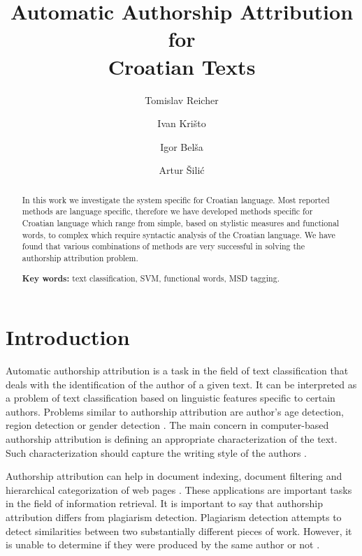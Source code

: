 \documentclass{llncs}
\begin{document}
\title{Automatic Authorship Attribution for\\Croatian Texts}
\author{Tomislav Reicher \and Ivan Krišto \and Igor Belša \and Artur Šilić}

\maketitle

\begin{abstract}
In this work we investigate the system specific for Croatian language. Most
reported methods are language specific, therefore we have developed methods
specific for Croatian language which range from simple, based on stylistic
measures and functional words, to complex which require syntactic analysis of the
Croatian language. We have found that various combinations of methods are very
successful in solving the authorship attribution problem.

\vspace{10pt}
\textbf{Key words:} text classification, SVM, functional words, MSD tagging.
\end{abstract}

\section{Introduction}
Automatic authorship attribution is a task in the field of text classification
that deals with the identification of the author of a given text. It can
be interpreted as a problem of text classification based on linguistic features
specific to certain authors. Problems similar to authorship attribution are
author's age detection, region detection or gender detection \cite{luyckx2005shallow}. The main
concern in computer-based authorship attribution is defining an appropriate
characterization of the text. Such characterization should capture the writing
style of the authors \cite{coyotl2006authorship}.

Authorship attribution can help in document indexing, document filtering and
hierarchical categorization of web pages \cite{luyckx2005shallow}. These
applications are important tasks in the field of information retrieval. 
It is important to say that authorship attribution differs from plagiarism
detection. Plagiarism detection attempts to detect similarities between two substantially different pieces of
work. However, it is unable to determine if they were produced by the same author or not
\cite{de2001mining}.
\end{document}
